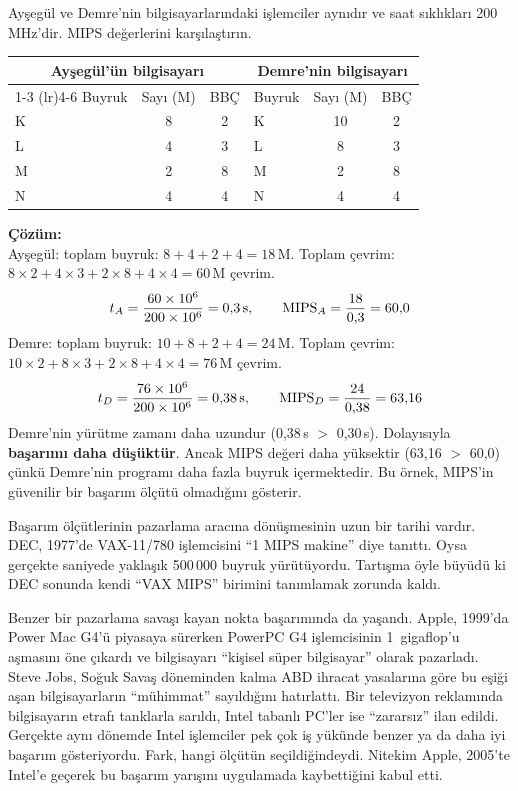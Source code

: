 \begin{ornek}[2.5]
Ayşegül ve Demre'nin bilgisayarlarındaki işlemciler aynıdır ve saat sıklıkları 200\,MHz'dir. MIPS değerlerini karşılaştırın.

\begin{center}
\begin{tabular}{lcclcc}
\toprule
\multicolumn{3}{c}{\textbf{Ayşegül'ün bilgisayarı}} & \multicolumn{3}{c}{\textbf{Demre'nin bilgisayarı}} \\
\cmidrule(lr){1-3} \cmidrule(lr){4-6}
Buyruk & Sayı (M) & BBÇ & Buyruk & Sayı (M) & BBÇ \\
\midrule
K & 8  & 2 & K & 10 & 2 \\
L & 4  & 3 & L & 8  & 3 \\
M & 2  & 8 & M & 2  & 8 \\
N & 4  & 4 & N & 4  & 4 \\
\bottomrule
\end{tabular}
\end{center}

\textbf{Çözüm:}\\
Ayşegül: toplam buyruk: $8+4+2+4 = 18$\,M. Toplam çevrim: $8 \times 2 + 4 \times 3 + 2 \times 8 + 4 \times 4 = 60$\,M çevrim.
\[
t_A = \frac{60 \times 10^6}{200 \times 10^6} = 0{,}3 \text{\,s}, \qquad \text{MIPS}_A = \frac{18}{0{,}3} = 60{,}0
\]
Demre: toplam buyruk: $10+8+2+4 = 24$\,M. Toplam çevrim: $10 \times 2 + 8 \times 3 + 2 \times 8 + 4 \times 4 = 76$\,M çevrim.
\[
t_D = \frac{76 \times 10^6}{200 \times 10^6} = 0{,}38 \text{\,s}, \qquad \text{MIPS}_D = \frac{24}{0{,}38} = 63{,}16
\]
Demre'nin yürütme zamanı daha uzundur (0,38\,s $>$ 0,30\,s). Dolayısıyla \textbf{başarımı daha düşüktür}. Ancak MIPS değeri daha yüksektir (63,16 $>$ 60,0) çünkü Demre'nin programı daha fazla buyruk içermektedir. Bu örnek, MIPS'in güvenilir bir başarım ölçütü olmadığını gösterir.
\end{ornek}

\begin{bilginot}
Başarım ölçütlerinin pazarlama aracına dönüşmesinin uzun bir tarihi vardır. DEC, 1977'de VAX-11/780 işlemcisini ``1 MIPS makine'' diye tanıttı. Oysa gerçekte saniyede yaklaşık 500\,000 buyruk yürütüyordu. Tartışma öyle büyüdü ki DEC sonunda kendi ``VAX MIPS'' birimini tanımlamak zorunda kaldı.

Benzer bir pazarlama savaşı kayan nokta başarımında da yaşandı. Apple, 1999'da Power Mac G4'ü piyasaya sürerken PowerPC G4 işlemcisinin 1~gigaflop'u aşmasını öne çıkardı ve bilgisayarı ``kişisel süper bilgisayar'' olarak pazarladı. Steve Jobs, Soğuk Savaş döneminden kalma ABD ihracat yasalarına göre bu eşiği aşan bilgisayarların ``mühimmat'' sayıldığını hatırlattı. Bir televizyon reklamında bilgisayarın etrafı tanklarla sarıldı, Intel tabanlı PC'ler ise ``zararsız'' ilan edildi. Gerçekte aynı dönemde Intel işlemciler pek çok iş yükünde benzer ya da daha iyi başarım gösteriyordu. Fark, hangi ölçütün seçildiğindeydi. Nitekim Apple, 2005'te Intel'e geçerek bu başarım yarışını uygulamada kaybettiğini kabul etti.
\end{bilginot}

